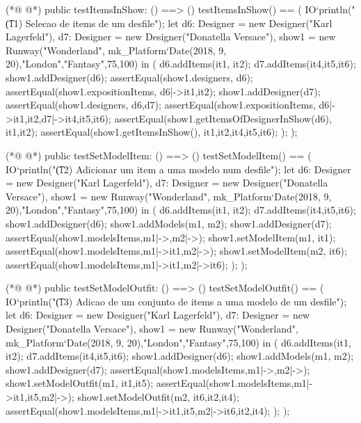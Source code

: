 \begin{vdmpp}[breaklines=true]
(*@
\label{testItemsInShow:185}
@*)
 public testItemsInShow: () ==> ()
 testItemsInShow() == (
  IO`println("\t (11) Selecao de items de um desfile");
  let d6: Designer = new Designer("Karl Lagerfeld"),
    d7: Designer = new Designer("Donatella Versace"),
  show1 = new Runway("Wonderland", mk_Platform`Date(2018, 9, 20),"London","Fantasy",75,100) in (
    d6.addItems({it1, it2});
    d7.addItems({it4,it5,it6});
    show1.addDesigner(d6);
    assertEqual(show1.designers, {d6});
    assertEqual(show1.expositionItems, {d6|->{it1,it2}});
    show1.addDesigner(d7);
    assertEqual(show1.designers, {d6,d7});
    assertEqual(show1.expositionItems, {d6|->{it1,it2},d7|->{it4,it5,it6}});
    assertEqual(show1.getItemsOfDesignerInShow(d6), {it1,it2});
    assertEqual(show1.getItemsInShow(), {it1,it2,it4,it5,it6});
  );
 );
 
(*@
\label{testSetModelItem:204}
@*)
 public testSetModelItem: () ==> ()
 testSetModelItem() == (
  IO`println("\t (12) Adicionar um item a uma modelo num desfile");
  let d6: Designer = new Designer("Karl Lagerfeld"),
    d7: Designer = new Designer("Donatella Versace"),
  show1 = new Runway("Wonderland", mk_Platform`Date(2018, 9, 20),"London","Fantasy",75,100) in (
    d6.addItems({it1, it2});
    d7.addItems({it4,it5,it6});
    show1.addDesigner(d6);
    show1.addModels({m1, m2});
    show1.addDesigner(d7);
    assertEqual(show1.modelsItems,{m1|->{},m2|->{}});
    show1.setModelItem(m1, it1);
    assertEqual(show1.modelsItems,{m1|->{it1},m2|->{}});
    show1.setModelItem(m2, it6);
    assertEqual(show1.modelsItems,{m1|->{it1},m2|->{it6}});
  );
 );
 
(*@
\label{testSetModelOutfit:223}
@*)
 public testSetModelOutfit: () ==> ()
 testSetModelOutfit() == (
  IO`println("\t (13) Adicao de um conjunto de items a uma modelo de um desfile");
  let d6: Designer = new Designer("Karl Lagerfeld"),
    d7: Designer = new Designer("Donatella Versace"),
  show1 = new Runway("Wonderland", mk_Platform`Date(2018, 9, 20),"London","Fantasy",75,100) in (
    d6.addItems({it1, it2});
    d7.addItems({it4,it5,it6});
    show1.addDesigner(d6);
    show1.addModels({m1, m2});
    show1.addDesigner(d7);
    assertEqual(show1.modelsItems,{m1|->{},m2|->{}});
    show1.setModelOutfit(m1, {it1,it5});
    assertEqual(show1.modelsItems,{m1|->{it1,it5},m2|->{}});
    show1.setModelOutfit(m2, {it6,it2,it4});
    assertEqual(show1.modelsItems,{m1|->{it1,it5},m2|->{it6,it2,it4}});
  );
 );
 

\end{vdmpp}

